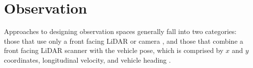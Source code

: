 %     

%     

%     




%

\section{Observation}
Approaches to designing observation spaces generally fall into two categories: those that use only a front facing LiDAR or camera \cite{Perot2017, Jaritz2018, hsu2022, brunnbauer2021}, and those that combine a front facing LiDAR scanner with the vehicle pose, which is comprised by $x$ and $y$ coordinates, longitudinal velocity, and vehicle heading \cite{Song2021,  Fuchs2021, Ivanov2020, Schwarting2021, Niu2020, hsu2022, Chisari2021, Remonda2021}.

